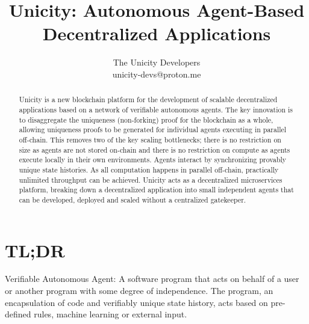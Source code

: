 \documentclass{article}
\title{Unicity: Autonomous Agent-Based Decentralized Applications}
\author{The Unicity Developers\\unicity-devs@proton.me}
\date{}
\begin{document}
\maketitle



\begin{abstract}
\noindent  Unicity is a new  blockchain platform for the development of scalable decentralized applications based on a network of verifiable autonomous agents. The key innovation is to disaggregate the uniqueness (non-forking) proof for the blockchain as a whole, allowing uniqueness proofs to be generated for individual agents executing in parallel off-chain. This removes two of the key scaling bottlenecks; there is no restriction on size as agents are not stored on-chain and there is no restriction on compute as  agents execute locally in their own environments. Agents interact by synchronizing provably unique state histories. As all computation happens in parallel off-chain, practically unlimited throughput can be achieved. Unicity acts as a decentralized microservices platform, breaking down a decentralized application into small independent agents that can be developed, deployed and scaled without a centralized gatekeeper.
\end{abstract}

\vspace{2mm}




\section*{TL;DR}

Verifiable Autonomous Agent:  A software program that acts on behalf of a user or another program with some degree of independence. The program, an encapsulation of code and verifiably unique state history, acts based on pre-defined rules, machine learning or external input.
\end{document}
